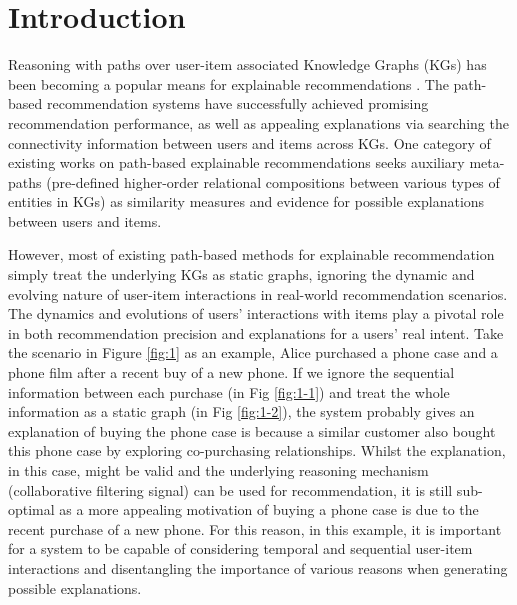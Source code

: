 \section{Introduction}
Reasoning with paths over user-item associated Knowledge Graphs (KGs) has been becoming a popular means for explainable recommendations \cite{xian2019reinforcement, wang2019explainable, zhao2020leveraging}. The path-based recommendation systems have successfully achieved promising recommendation performance, as well as appealing explanations via searching the connectivity information between users and items across KGs. One category of existing works on path-based explainable recommendations seeks auxiliary meta-paths (pre-defined higher-order relational compositions between various types of entities in KGs) as similarity measures and evidence for possible explanations between users and items. 

However, most of existing path-based methods for explainable recommendation simply treat the underlying KGs as static graphs, ignoring the dynamic and evolving nature of user-item interactions in real-world recommendation scenarios. The dynamics and evolutions of users' interactions with items play a pivotal role in both recommendation precision and explanations for a users' real intent. Take the scenario in Figure \ref{fig:1} as an example, Alice purchased a phone case and a phone film after a recent buy of a new phone. If we ignore the sequential information between each purchase (in Fig \ref{fig:1-1}) and treat the whole information as a static graph (in Fig \ref{fig:1-2}), the system probably gives an explanation of buying the phone case is because a similar customer also bought this phone case by exploring co-purchasing relationships. Whilst the explanation, in this case, might be valid and the underlying reasoning mechanism (collaborative filtering signal) can be used for recommendation, it is still sub-optimal as a more appealing motivation of buying a phone case is due to the recent purchase of a new phone. For this reason, in this example, it is important for a system to be capable of considering temporal and sequential user-item interactions and disentangling the importance of various reasons when generating possible explanations. 


